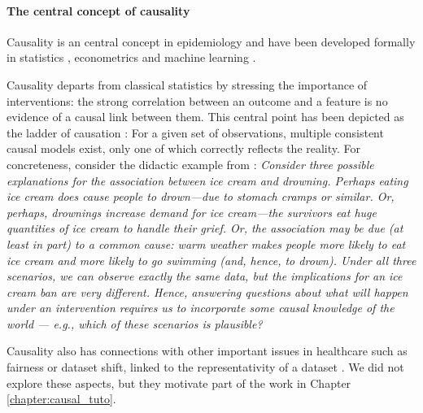 \documentclass[french,12pt,twoside,a4paper]{book}
\begin{document}
\begin{background_box_left}



  \paragraph{The central concept of causality}%
  \label{subsec:intro:causation}%

  Causality is an central concept in epidemiology
  \citep{hill1965environment,hernan2020causal} and have been developed formally
  in statistics \citep{rubin1974estimating}, econometrics
  \citep{imbens2009recent} and machine learning \citep{pearl2018book}.

  Causality departs from classical statistics by stressing the importance of
  interventions: the strong correlation between an outcome and a feature is no
  evidence of a causal link between them. This central point has been depicted
  as the ladder of causation \citep{pearl2018book}: For a given set of
  observations, multiple consistent causal models exist, only one of which
  correctly reflects the reality. For concreteness, consider the didactic
  example from \cite{murphy2022probabilistic_chapter36}: \textit{Consider three
    possible explanations for the association between ice cream and drowning.
    Perhaps eating ice cream does cause people to drown—due to stomach cramps or
    similar. Or, perhaps, drownings increase demand for ice cream—the survivors
    eat huge quantities of ice cream to handle their grief. Or, the association
    may be due (at least in part) to a common cause: warm weather makes people
    more likely to eat ice cream and more likely to go swimming (and, hence, to
    drown). Under all three scenarios, we can observe exactly the same data, but
    the implications for an ice cream ban are very different. Hence, answering
    questions about what will happen under an intervention requires us to
    incorporate some causal knowledge of the world — e.g., which of these scenarios
    is plausible?}

  Causality also has connections with other important issues in healthcare such
  as fairness \citep{plecko2022causal} or dataset shift, linked to the representativity of a
  dataset \citep{subbaswamy2020development}. We did not explore these aspects,
  but they motivate part of the work in Chapter \ref{chapter:causal_tuto}.


\end{background_box_left}
\end{document}
